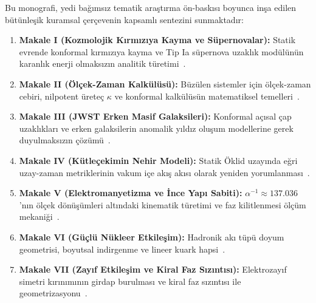 Bu monografi, yedi bağımsız tematik araştırma ön-baskısı boyunca inşa edilen bütünleşik kuramsal çerçevenin kapsamlı sentezini sunmaktadır:
\begin{enumerate}
    \item \textbf{Makale I (Kozmolojik Kırmızıya Kayma ve Süpernovalar):} Statik evrende konformal kırmızıya kayma ve Tip Ia süpernova uzaklık modülünün karanlık enerji olmaksızın analitik türetimi~\cite{haydari_cosmo}.
    \item \textbf{Makale II (Ölçek-Zaman Kalkülüsü):} Büzülen sistemler için ölçek-zaman cebiri, nilpotent üreteç $\kappa$ ve konformal kalkülüsün matematiksel temelleri~\cite{haydari_calculus}.
    \item \textbf{Makale III (JWST Erken Masif Galaksileri):} Konformal açısal çap uzaklıkları ve erken galaksilerin anomalik yıldız oluşum modellerine gerek duyulmaksızın çözümü~\cite{haydari_jwst}.
    \item \textbf{Makale IV (Kütleçekimin Nehir Modeli):} Statik Öklid uzayında eğri uzay-zaman metriklerinin vakum içe akış akısı olarak yeniden yorumlanması~\cite{haydari_gravity}.
    \item \textbf{Makale V (Elektromanyetizma ve İnce Yapı Sabiti):} $\alpha^{-1} \approx 137.036$'nın ölçek dönüşümleri altındaki kinematik türetimi ve faz kilitlenmesi ölçüm mekaniği~\cite{haydari_em}.
    \item \textbf{Makale VI (Güçlü Nükleer Etkileşim):} Hadronik akı tüpü doyum geometrisi, boyutsal indirgenme ve lineer kuark hapsi~\cite{haydari_strong}.
    \item \textbf{Makale VII (Zayıf Etkileşim ve Kiral Faz Sızıntısı):} Elektrozayıf simetri kırınımının girdap burulması ve kiral faz sızıntısı ile geometrizasyonu~\cite{haydari_weak}.
\end{enumerate}

